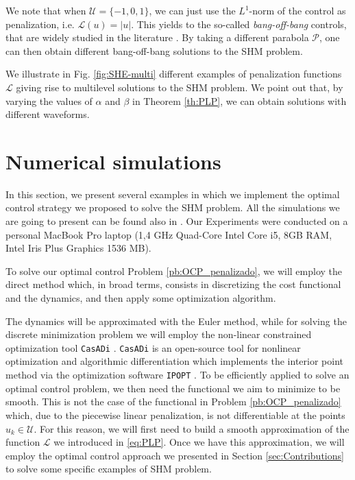 \documentclass[twocolumn]{autart}    %
\begin{document}
\medskip

\begin{remark}
We note that when  $\mathcal{U}= \{-1,0,1\}$, we can just use the $L^1$-norm of the control as penalization, i.e. $\mathcal{L}(u) = |u|$. This yields to the so-called \emph{bang-off-bang} controls, that are widely studied in the literature \cite{nagahara2013maximum,ikeda2016maximum}. By taking a different parabola $\mathcal{P}$, one can then obtain different bang-off-bang solutions to the SHM problem.
\end{remark}

We illustrate in Fig. \ref{fig:SHE-multi} different examples of penalization functions $\mathcal{L}$ giving rise to multilevel solutions to the SHM problem. We point out that, by varying the values of $\alpha$ and $\beta$ in Theorem \ref{th:PLP}, we can obtain solutions with different waveforms.

\bigskip

\section{Numerical simulations}\label{sec:Simulations}

In this section, we present several examples in which we implement the optimal control strategy we proposed to solve the SHM problem. All the simulations we are going to present can be found also in \cite{simus}. Our Experiments were conducted on a personal MacBook Pro laptop (1,4 GHz Quad-Core Intel Core i5, 8GB RAM, Intel Iris Plus Graphics 1536 MB). 

To solve our optimal control Problem \ref{pb:OCP_penalizado}, we will employ the direct method \cite{rao2009survey} which, in broad terms, consists in discretizing the cost functional and the dynamics, and then apply some optimization algorithm. 

The dynamics will be approximated with the Euler method, while for solving the discrete minimization problem we will employ the non-linear constrained optimization tool \texttt{CasADi} \cite{Andersson2019}. \texttt{CasADi} is an open-source tool for nonlinear optimization and algorithmic differentiation which implements the interior point method via the optimization software \texttt{IPOPT} \cite{wachter2006implementation}. To be efficiently applied to solve an optimal control problem, we then need the functional we aim to minimize to be smooth. This is not the case of the functional in Problem \ref{pb:OCP_penalizado} which, due to the piecewise linear penalization, is not differentiable at the points $u_k\in\mathcal U$. For this reason, we will first need to build a smooth approximation of the  function $\mathcal L$ we introduced in \eqref{eq:PLP}. Once we have this approximation, we will employ the optimal control approach we presented in Section \ref{sec:Contributions} to solve some specific examples of SHM problem.
\end{document}

